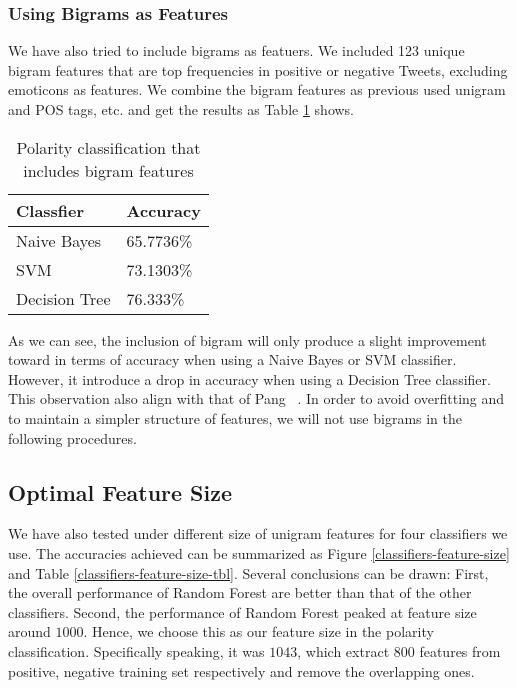 \documentclass[12pt]{article}
\begin{document}
\subsubsection{Using Bigrams as Features}

We have also tried to include bigrams as featuers. We included 123 unique bigram features that are top frequencies in positive or negative Tweets, excluding emoticons as features. We combine the bigram features as previous used unigram and POS tags, etc. and get the results as Table \ref{bigrams-polarity} shows.

\begin{table}
\begin{center}
    \begin{tabular}{ | l || l | }
        \hline
        \textbf{Classfier} &  \textbf{Accuracy} \\ \hline
        \hline
        Naive Bayes &  65.7736\% \\ \hline
        SVM & 73.1303\% \\ \hline
        Decision Tree & 76.333\% \\ \hline
    \end{tabular}
\caption{Polarity classification that includes bigram features}
\label{bigrams-polarity}
\end{center}
\end{table}

As we can see, the inclusion of bigram will only produce a slight improvement toward in terms of accuracy when using a Naive Bayes or SVM classifier. However, it introduce a drop in accuracy when using a Decision Tree classifier. This observation also align with that of Pang \etal~\cite{Pang:02}. In order to avoid overfitting and to maintain a simpler structure of features, we will not use bigrams in the following procedures.

\subsection{Optimal Feature Size}

We have also tested under different size of unigram features for four classifiers we use. The accuracies achieved can be summarized as Figure \ref{classifiers-feature-size} and Table \ref{classifiers-feature-size-tbl}. Several conclusions can be drawn: First, the overall performance of Random Forest are better than that of the other classifiers. Second, the performance of Random Forest peaked at feature size around $1000$. Hence, we choose this as our feature size in the polarity classification. Specifically speaking, it was $1043$, which extract $800$ features from positive, negative training set respectively and remove the overlapping ones.
\end{document}
